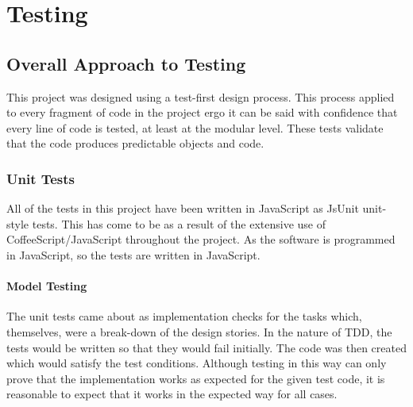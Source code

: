 \cleardoublepage
\chapter{Testing} %



\section{Overall Approach to Testing}
This project was designed using a test-first design process. This process applied to every fragment of code in the project ergo it can be said with confidence that every line of code is tested, at least at the modular level. These tests validate that the code produces predictable objects and code.

\subsection{Unit Tests}
All of the tests in this project have been written in Java\-Script as JsUnit unit-style tests. This has come to be as a result of the extensive use of Coffee\-Script\slash Java\-Script throughout the project. As the software is programmed in Java\-Script, so the tests are written in Java\-Script.

\subsubsection{Model Testing}
The unit tests came about as implementation checks for the tasks which, themselves, were a break-down of the design stories. In the nature of TDD, the tests would be written so that they would fail initially. The code was then created which would satisfy the test conditions. Although testing in this way can only prove that the implementation works as expected for the given test code, it is reasonable to expect that it works in the expected way for all cases.

